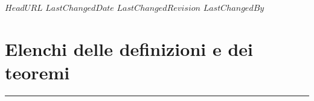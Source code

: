 \svnidlong
{$HeadURL$}
{$LastChangedDate$}
{$LastChangedRevision$}
{$LastChangedBy$}

\chapter{Elenchi delle definizioni e dei teoremi}
\nocite{*}
\listofdefinitions
\begin{center}
	\rule{4cm}{0.4pt}
\end{center}
\listoftheoremas